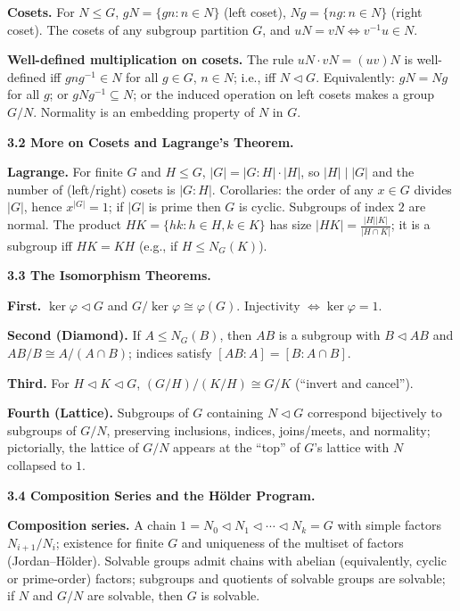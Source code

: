 \documentclass[12pt]{article}
\theoremstyle{definition}
\begin{document}
\medskip
\textbf{Cosets.} For $N\le G$, $gN=\{gn:n\in N\}$ (left coset), $Ng=\{ng:n\in N\}$ (right coset). The cosets of any subgroup partition $G$, and $uN=vN\iff v^{-1}u\in N$.

\medskip
\textbf{Well-defined multiplication on cosets.} The rule $uN\cdot vN=(uv)N$ is well-defined iff $gng^{-1}\in N$ for all $g\in G$, $n\in N$; i.e., iff $N\lhd G$. Equivalently: $gN=Ng$ for all $g$; or $gNg^{-1}\subseteq N$; or the induced operation on left cosets makes a group $G/N$. Normality is an embedding property of $N$ in $G$.

\newpage

\textbf{3.2 More on Cosets and Lagrange’s Theorem.}

\newpage

\medskip
\textbf{Lagrange.} For finite $G$ and $H\le G$, $|G|=|G:H|\cdot|H|$, so $|H|\mid|G|$ and the number of (left/right) cosets is $|G:H|$. Corollaries: the order of any $x\in G$ divides $|G|$, hence $x^{|G|}=1$; if $|G|$ is prime then $G$ is cyclic. Subgroups of index $2$ are normal. The product $HK=\{hk:h\in H,k\in K\}$ has size $|HK|=\frac{|H||K|}{|H\cap K|}$; it is a subgroup iff $HK=KH$ (e.g., if $H\le N_G(K)$).

\newpage

\textbf{3.3 The Isomorphism Theorems.}

\newpage

\medskip
\textbf{First.} $\ker\varphi\lhd G$ and $G/\ker\varphi\cong \varphi(G)$. Injectivity $\Leftrightarrow \ker\varphi=1$.

\medskip
\textbf{Second (Diamond).} If $A\le N_G(B)$, then $AB$ is a subgroup with $B\lhd AB$ and $AB/B\cong A/(A\cap B)$; indices satisfy $[AB:A]=[B:A\cap B]$.

\medskip
\textbf{Third.} For $H\lhd K\lhd G$, $(G/H)/(K/H)\cong G/K$ (“invert and cancel”).

\medskip
\textbf{Fourth (Lattice).} Subgroups of $G$ containing $N\lhd G$ correspond bijectively to subgroups of $G/N$, preserving inclusions, indices, joins/meets, and normality; pictorially, the lattice of $G/N$ appears at the “top” of $G$’s lattice with $N$ collapsed to $1$.

\newpage

\textbf{3.4 Composition Series and the Hölder Program.}

\newpage

\medskip
\textbf{Composition series.} A chain $1=N_0\lhd N_1\lhd\cdots\lhd N_k=G$ with simple factors $N_{i+1}/N_i$; existence for finite $G$ and uniqueness of the multiset of factors (Jordan–Hölder). Solvable groups admit chains with abelian (equivalently, cyclic or prime-order) factors; subgroups and quotients of solvable groups are solvable; if $N$ and $G/N$ are solvable, then $G$ is solvable.
\end{document}

